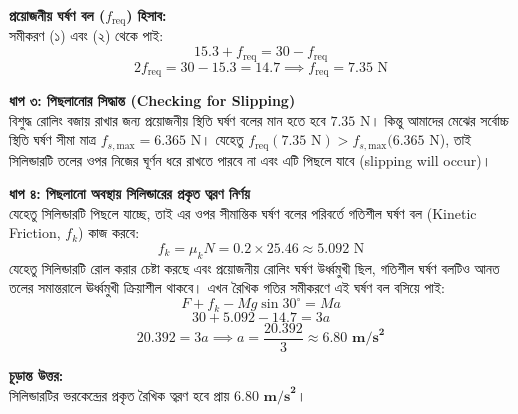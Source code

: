 \documentclass[12pt, a4paper]{article}
\begin{document}
\begin{tcolorbox}[solutionbox={সমাধান (Solution)}]
\textbf{প্রয়োজনীয় ঘর্ষণ বল ($f_{\text{req}}$) হিসাব:} \\
সমীকরণ (১) এবং (২) থেকে পাই:
\[ 15.3 + f_{\text{req}} = 30 - f_{\text{req}} \]
\[ 2 f_{\text{req}} = 30 - 15.3 = 14.7 \implies f_{\text{req}} = 7.35\text{ N} \]

\vspace{0.5em}
\noindent
\textbf{ধাপ ৩: পিছলানোর সিদ্ধান্ত (Checking for Slipping)} \\
বিশুদ্ধ রোলিং বজায় রাখার জন্য প্রয়োজনীয় স্থিতি ঘর্ষণ বলের মান হতে হবে $7.35\text{ N}$। কিন্তু আমাদের মেঝের সর্বোচ্চ স্থিতি ঘর্ষণ সীমা মাত্র $f_{s,\text{max}} = 6.365\text{ N}$।
যেহেতু $f_{\text{req}} (7.35\text{ N}) > f_{s,\text{max}} (6.365\text{ N}$), তাই সিলিন্ডারটি তলের ওপর নিজের ঘূর্ণন ধরে রাখতে পারবে না এবং এটি পিছলে যাবে (slipping will occur)।

\vspace{0.5em}
\noindent
\textbf{ধাপ ৪: পিছলানো অবস্থায় সিলিন্ডারের প্রকৃত ত্বরণ নির্ণয়} \\
যেহেতু সিলিন্ডারটি পিছলে যাচ্ছে, তাই এর ওপর সীমান্তিক ঘর্ষণ বলের পরিবর্তে গতিশীল ঘর্ষণ বল (Kinetic Friction, $f_k$) কাজ করবে:
\[ f_k = \mu_k N = 0.2 \times 25.46 \approx 5.092\text{ N} \]
যেহেতু সিলিন্ডারটি রোল করার চেষ্টা করছে এবং প্রয়োজনীয় রোলিং ঘর্ষণ উর্ধ্বমুখী ছিল, গতিশীল ঘর্ষণ বলটিও আনত তলের সমান্তরালে ঊর্ধ্বমুখী ক্রিয়াশীল থাকবে। এখন রৈখিক গতির সমীকরণে এই ঘর্ষণ বল বসিয়ে পাই:
\[ F + f_k - Mg \sin 30^\circ = Ma \]
\[ 30 + 5.092 - 14.7 = 3a \]
\[ 20.392 = 3a \implies a = \frac{20.392}{3} \approx \mathbf{6.80\text{ m/s}^2} \]

\vspace{1em}
\begin{tcolorbox}[answerbox]
\textbf{চূড়ান্ত উত্তর:} \\
সিলিন্ডারটির ভরকেন্দ্রের প্রকৃত রৈখিক ত্বরণ হবে প্রায় $\mathbf{6.80\text{ m/s}^2}$।
\end{tcolorbox}
\end{tcolorbox}
\end{document}
